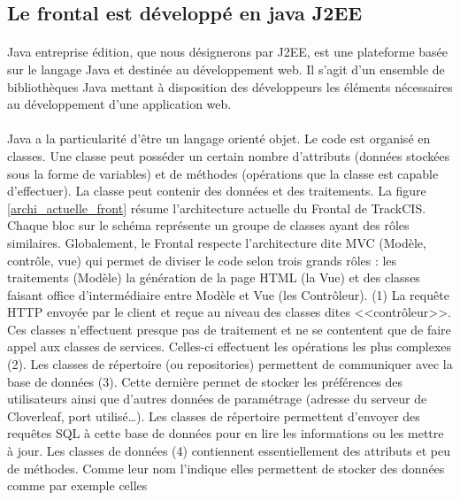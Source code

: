 		\subsection{Le frontal est développé en java J2EE}
			\paragraph{}%
			Java entreprise édition, que nous désignerons par J2EE, est une
			plateforme basée sur le langage Java et destinée au développement web. Il
			s'agit d'un ensemble de bibliothèques Java mettant à disposition des
			développeurs les éléments nécessaires au développement d'une application
			web.
			
			\paragraph{}
			Java a la particularité d'être un langage orienté objet. Le code est organisé
			en classes. Une classe peut posséder un certain nombre d'attributs
			(données stockées sous la forme de variables) et de méthodes (opérations
			que la classe est capable d'effectuer). La classe peut contenir des données
			et des traitements. La figure \ref{archi_actuelle_front} résume
			l'architecture actuelle du Frontal de TrackCIS. Chaque bloc sur le schéma représente un
			groupe de classes ayant des rôles similaires. Globalement, le Frontal
			respecte l'architecture dite MVC (Modèle, contrôle, vue) qui permet de
			diviser le code selon trois grands rôles : les traitements (Modèle) la
			génération de la page HTML (la Vue) et des classes faisant office
			d'intermédiaire entre Modèle et Vue (les Contrôleur). (1) La requête HTTP
			envoyée par le client et reçue au niveau des classes dites <<contrôleur>>.
			Ces classes n'effectuent presque pas de traitement et ne se contentent que de
			faire appel aux classes de services.
			Celles-ci effectuent les opérations les plus complexes (2). Les classes de
			répertoire (ou repositories) permettent de communiquer avec la base de
			données (3).
			Cette dernière permet de stocker les préférences des utilisateurs ainsi que
			d'autres données de paramétrage (adresse du serveur de
			Cloverleaf, port utilisé\ldots). Les classes de répertoire permettent
			d'envoyer des requêtes SQL à cette base de données pour en lire les
			informations ou les mettre à jour. Les classes de données (4) contiennent
			essentiellement des attributs et peu de méthodes. Comme leur nom
			l'indique elles permettent de stocker des données comme par exemple celles
